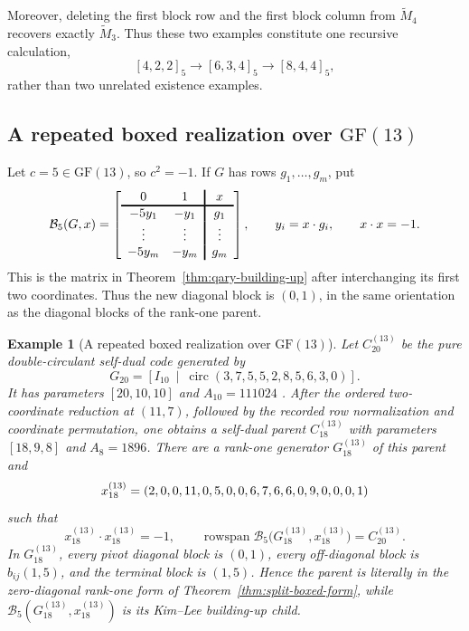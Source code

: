 \documentclass[12pt]{article}
\newtheorem{example}[theorem]{Example}
\newcommand{\GF}[1]{\ensuremath{\mathrm{GF}(#1)}}
\begin{document}
Moreover, deleting the first block row and the first block column from
\(\widetilde M_4\) recovers exactly \(\widetilde M_3\).  Thus these two
examples constitute one recursive calculation,
\[
[4,2,2]_5\longrightarrow[6,3,4]_5
\longrightarrow[8,4,4]_5,
\]
rather than two unrelated existence examples.

\subsection{A repeated boxed realization over
\texorpdfstring{\(\GF{13}\)}{GF(13)}}

Let \(c=5\in\GF{13}\), so \(c^2=-1\).  If \(G\) has rows
\(g_1,\ldots,g_m\), put
\begin{equation}
\mathcal B_5(G,x)=
\left[
\begin{array}{cc!{\vrule width 1.2pt}c}
0&1&x\\
\noalign{\hrule height 1.2pt}
-5y_1&-y_1&g_1\\
\vdots&\vdots&\vdots\\
-5y_m&-y_m&g_m
\end{array}
\right],
\qquad y_i=x\cdot g_i,\qquad x\cdot x=-1.
\label{eq:gf13-repeated-box}
\end{equation}
This is the matrix in Theorem~\ref{thm:qary-building-up} after interchanging
its first two coordinates.  Thus the new diagonal block is \((0,1)\), in the
same orientation as the diagonal blocks of the rank-one parent.

\begin{example}[A repeated boxed realization over
\texorpdfstring{\(\GF{13}\)}{GF(13)}]
\label{ex:gf13-repeated-realization}
\rm
Let \(C_{20}^{(13)}\) be the pure double-circulant self-dual code generated
by
\[
G_{20}=\left[I_{10}\ \middle|\
\operatorname{circ}(3,7,5,5,2,8,5,6,3,0)\right].
\]
It has parameters \([20,10,10]\) and \(A_{10}=111024\)
\cite{BetsumiyaEtAl}.  After the ordered two-coordinate reduction at
\((11,7)\), followed by the recorded row normalization and coordinate
permutation, one obtains a self-dual parent \(C_{18}^{(13)}\) with parameters
\([18,9,8]\) and \(A_8=1896\).  There are a rank-one generator
\(G_{18}^{(13)}\) of this parent and
\[
x_{18}^{(13)}=(2,0,0,11,0,5,0,0,6,7,6,6,0,9,0,0,0,1)
\]
such that
\[
x_{18}^{(13)}\cdot x_{18}^{(13)}=-1,\qquad
\operatorname{rowspan}\mathcal B_5
 \bigl(G_{18}^{(13)},x_{18}^{(13)}\bigr)=C_{20}^{(13)}.
\]
In \(G_{18}^{(13)}\), every pivot diagonal block is \((0,1)\), every
off-diagonal block is \(b_{ij}(1,5)\), and the terminal block is \((1,5)\).
Hence the parent is literally in the zero-diagonal rank-one form of
Theorem~\ref{thm:split-boxed-form}, while
\(\mathcal B_5(G_{18}^{(13)},x_{18}^{(13)})\) is its Kim--Lee
building-up child.
\end{example}
\end{document}
